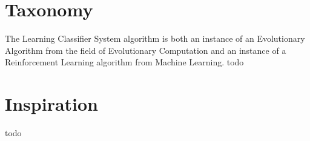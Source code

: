 \documentclass[a4paper, 11pt]{article}
\begin{document}
\section{Taxonomy}
\label{sec:taxonomy}
The Learning Classifier System algorithm is both an instance of an Evolutionary Algorithm from the field of Evolutionary Computation and an instance of a Reinforcement Learning algorithm from Machine Learning.
todo

\section{Inspiration}
\label{sec:inspiration}
todo

\end{document}
